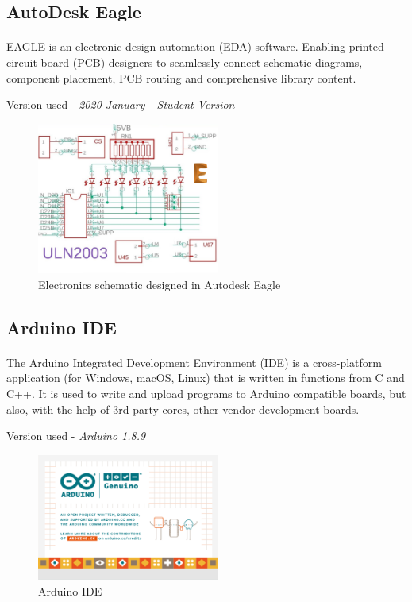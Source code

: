 \subsection{AutoDesk Eagle}
\paragraph{}EAGLE is an electronic design automation (EDA) software. Enabling printed circuit board (PCB) designers to seamlessly connect schematic diagrams, component placement, PCB routing and comprehensive library content. %

Version used - \textit{2020 January - Student Version}

\begin{figure}[H]
\centering
\includegraphics[width = 6cm]{project/images/uln2003.png}
\caption{Electronics schematic designed in Autodesk Eagle}\label{uln2003}
\end{figure}

\subsection{Arduino IDE}
\paragraph{}The Arduino Integrated Development Environment (IDE) is a cross-platform application (for Windows, macOS, Linux) that is written in functions from C and C++. It is used to write and upload programs to Arduino compatible boards, but also, with the help of 3rd party cores, other vendor development boards. %

Version used - \textit{Arduino 1.8.9}

\begin{figure}[H]
\centering
\includegraphics[width = 6cm]{project/images/arduino_ide.png}
\caption{Arduino IDE}
\end{figure}

